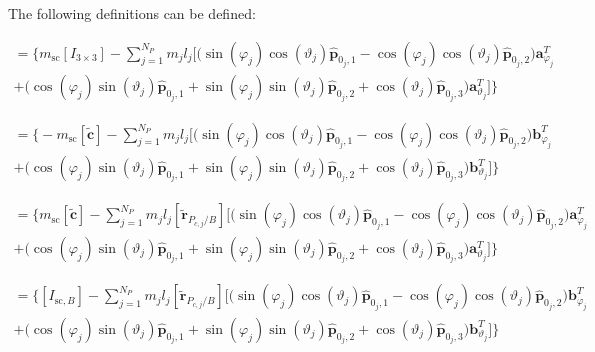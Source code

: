 The following definitions can be defined:

\begin{multline}
	[A] = \Big\{m_{\text{sc}}[I_{3\times3}] -\sum_{j=1}^{N_{P}}m_j l_j \bigg[
	\Big(\sin(\varphi_j)\cos(\vartheta_j)\bm{\hat{p}}_{0_j,1}-\cos(\varphi_j)\cos(\vartheta_j)\bm{\hat{p}}_{0_j,2}\Big)\bm a_{\varphi_j}^T \\ +\Big(\cos(\varphi_j)\sin(\vartheta_j)\bm{\hat{p}}_{0_j,1}+\sin(\varphi_j)\sin(\vartheta_j)\bm{\hat{p}}_{0_j,2}+\cos(\vartheta_j)\bm{\hat{p}}_{0_j,3}\Big)\bm a_{\vartheta_j}^T \bigg]\Big\}
\end{multline}

\begin{multline}
	[B] = 	\Big\{-m_{\text{sc}}[\tilde{\bm{c}}] -\sum_{j=1}^{N_{P}}m_j l_j \bigg[
	\Big(\sin(\varphi_j)\cos(\vartheta_j)\bm{\hat{p}}_{0_j,1}-\cos(\varphi_j)\cos(\vartheta_j)\bm{\hat{p}}_{0_j,2}\Big)\bm b_{\varphi_j}^T\\ +\Big(\cos(\varphi_j)\sin(\vartheta_j)\bm{\hat{p}}_{0_j,1}+\sin(\varphi_j)\sin(\vartheta_j)\bm{\hat{p}}_{0_j,2}+\cos(\vartheta_j)\bm{\hat{p}}_{0_j,3}\Big)\bm b_{\vartheta_j}^T \bigg] \Big\}
\end{multline}

\begin{multline}
	[C] = \Big\{m_{\text{sc}}[\tilde{\bm{c}}] - \sum\limits_{j=1}^{N_P}m_j l_j [\tilde{\bm{r}}_{P_{c,j}/B}] \bigg[
	\Big(\sin(\varphi_j)\cos(\vartheta_j)\bm{\hat{p}}_{0_j,1}-\cos(\varphi_j)\cos(\vartheta_j)\bm{\hat{p}}_{0_j,2}\Big)\bm a_{\varphi_j}^T \\
	+\Big(\cos(\varphi_j)\sin(\vartheta_j)\bm{\hat{p}}_{0_j,1}+\sin(\varphi_j)\sin(\vartheta_j)\bm{\hat{p}}_{0_j,2}+\cos(\vartheta_j)\bm{\hat{p}}_{0_j,3} \Big)\bm a_{\vartheta_j}^T
	\bigg]
	\Big\}
\end{multline}

\begin{multline}
	[D] = \Big\{[I_{\text{sc},B}] - \sum\limits_{j=1}^{N_P}m_j l_j [\tilde{\bm{r}}_{P_{c,j}/B}] \bigg[
	\Big(\sin(\varphi_j)\cos(\vartheta_j)\bm{\hat{p}}_{0_j,1}-\cos(\varphi_j)\cos(\vartheta_j)\bm{\hat{p}}_{0_j,2}\Big)\bm b_{\varphi_j}^T \\
	+\Big(\cos(\varphi_j)\sin(\vartheta_j)\bm{\hat{p}}_{0_j,1}
	+\sin(\varphi_j)\sin(\vartheta_j)\bm{\hat{p}}_{0_j,2}+\cos(\vartheta_j)\bm{\hat{p}}_{0_j,3} \Big)\bm b_{\vartheta_j}^T
	\bigg]
	\Big\}
\end{multline}

